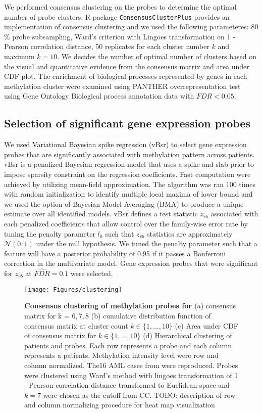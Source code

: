 \documentclass{article}
\begin{document}
We performed consensus clustering \citep{monti2003consensus} on the probes to determine the optimal number of probe clusters. R package \texttt{ConsensusClusterPlus} \citep{wilkerson2010consensusclusterplus} provides an implementation of consensus clustering and we used the following parameteres: 80 \% probe subsampling, Ward's criterion with Lingoes transformation on 1 - Pearson correlation distance, 50 replicates for each cluster number $k$  and maximum $k = 10$.  We decides the number of optimal number of clusters based on the visual and quantitative evidence from the consensus matrix and area under CDF plot. The enrichment of biological processes represented by genes in each methylation cluster were examined using PANTHER overrepresentation test using Gene Ontology Biological process annotation data \citep{mi2013large} with $ FDR < 0.05$.

\subsection{Selection of significant gene expression probes}
We used Variational Bayesian spike regression (vBsr) \cite{logsdon2012novel} to select gene expression probes that are significantly associated with methylation pattern across patients. vBsr is a penalized Bayesian regression model that uses a spike-and-slab prior to impose sparsity constraint on the regression coefficients. Fast computation were achieved by utilizing mean-field approximation. The algorithm was ran 100 times with random initialization to identify multiple local maxima of lower bound and we used the option of Bayesian Model Averaging (BMA) to produce a unique estimate over all identified models. vBsr defines a test statistic $z_{vb}$ associated with each penalized coefficients that allow control over the family-wise error rate by tuning the penalty parameter $l_0$  such that $z_{vb}$ statistics are approximately $\mathcal{N}(0, 1)$ under the null hypothesis. We tuned the penalty parameter such that a feature will have a posterior probability of 0.95 if it passes a Bonferroni correction in the multivariate model. Gene expression probes that were significant for $z_{vb}$ at $\widehat{FDR} = 0.1$ were selected. 

\begin{figure*}[htb!]
\centering
\texttt{[image: Figures/clustering]}
\caption{\textbf{Consensus clustering of methylation probes for \citet{figueroa2010dna}} (a) consensus matrix for k = $6, 7, 8$ (b) cumulative distribution function of consensus matrix at cluster count $k \in \{1, \dots, 10\}$ (c) Area under CDF of consensus matrix for $k \in \{1, \dots, 10\}$ (d) Hierarchical clustering of patients and probes. Each row represents a probe and each column represents a patients. Methylation intensity level were row and column normalized. The16 AML cases from \citet{figueroa2010dna} were reproduced. Probes were clustered using Ward's method with lingoes transformation of 1 - Pearson correlation distance transformed to Euclidean space and $k=7$ were chosen as the cutoff from CC. {\color{red} TODO: description of row and column normalizing procedure for heat map visualization}}
\label{CC}
\end{figure*}
\end{document}
